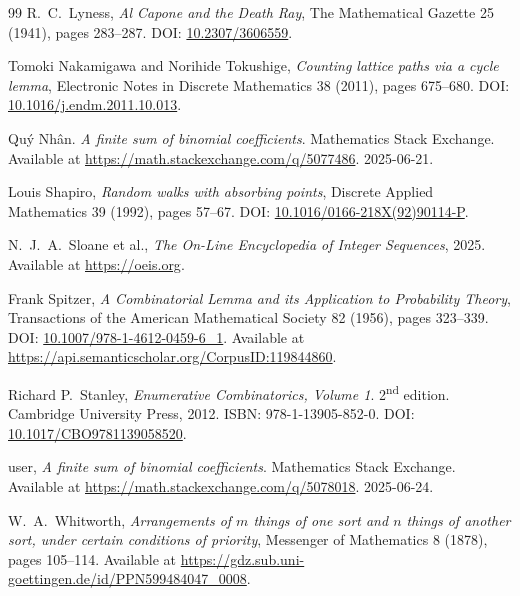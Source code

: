 \documentclass[10pt]{article}
\newcommand{\doi}[1]{\textsc{DOI}: \href{https://dx.doi.org/#1}{#1}}
\begin{document}
\begin{thebibliography}{99}
R.\ C.\ Lyness, \emph{Al Capone and the Death Ray}, The Mathematical Gazette 25 (1941), pages 283--287.  \doi{10.2307/3606559}.

Tomoki Nakamigawa and Norihide Tokushige, \emph{Counting lattice paths via a cycle lemma}, Electronic Notes in Discrete Mathematics 38 (2011), pages 675--680.  \doi{10.1016/j.endm.2011.10.013}.

Qu\'{y} Nh\^{a}n. \emph{A finite sum of binomial coefficients}.  Mathematics Stack Exchange.  Available at \url{https://math.stackexchange.com/q/5077486}.  2025-06-21.


Louis Shapiro, \emph{Random walks with absorbing points}, Discrete Applied Mathematics 39 (1992), pages 57--67.  \doi{10.1016/0166-218X(92)90114-P}.

N.\ J.\ A.\ Sloane et al., {\em The On-Line Encyclopedia of Integer Sequences}, 2025. Available at \url{https://oeis.org}.

Frank Spitzer, \emph{A Combinatorial Lemma and its Application to Probability Theory}, Transactions of the American Mathematical Society 82 (1956), pages 323--339. \doi{10.1007/978-1-4612-0459-6\_1}.  Available at \url{https://api.semanticscholar.org/CorpusID:119844860}.

Richard P.\ Stanley, \emph{Enumerative Combinatorics, Volume 1}.  2\textsuperscript{nd} edition.  Cambridge University Press, 2012.  \textsc{ISBN}: 978-1-13905-852-0.  \doi{10.1017/CBO9781139058520}.

user, \emph{A finite sum of binomial coefficients}.  Mathematics Stack Exchange.  Available at \url{https://math.stackexchange.com/q/5078018}.  2025-06-24.

W.\ A.\ Whitworth, \emph{Arrangements of $m$ things of one sort and $n$ things of another sort, under certain conditions of priority}, Messenger of Mathematics 8 (1878), pages 105--114.  Available at \url{https://gdz.sub.uni-goettingen.de/id/PPN599484047_0008}.


\end{thebibliography}
\end{document}
